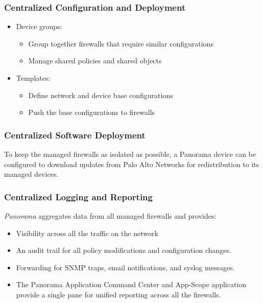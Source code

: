 \subsubsection{Centralized Configuration and Deployment}
\begin{itemize}
    \item Device groups:
        \begin{itemize}
            \item Group together firewalls that require similar configurations
            \item Manage shared policies and shared objects
        \end{itemize}
    \item Templates:
        \begin{itemize}
            \item Define network and device base configurations
            \item Push the base configurations to firewalls
        \end{itemize}
\end{itemize}

\subsubsection{Centralized Software Deployment}
To keep the managed firewalls as isolated as possible, a Panorama device can be configured to download updates from Palo Alto Networks for redistribution to its managed devices.

\subsubsection{Centralized Logging and Reporting}
\textit{Panorama} aggregates data from all managed firewalls and provides:
\begin{itemize}
    \item Visibility across all the traffic on the network
    \item An audit trail for all policy modifications and configuration changes.
    \item Forwarding for SNMP traps, email notifications, and syslog messages.
    \item The Panorama Application Command Center and App-Scope application provide a single pane for unified reporting across all the firewalls.
\end{itemize}

